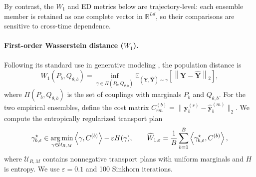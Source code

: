 By contrast, the $W_1$ and ED metrics below are trajectory-level: each
ensemble member is retained as one complete vector in $\mathbb R^{Ld}$, so
their comparisons are sensitive to cross-time dependence.

\paragraph{First-order Wasserstein distance ($W_1$).}
Following its standard use in generative modeling
\citep{arjovsky2017wasserstein}, the population distance is
\begin{equation}
  W_1(P_b,Q_{\theta,b})
  =
  \inf_{\gamma\in\Pi(P_b,Q_{\theta,b})}
  \mathbb{E}_{(\mathbf Y,\widehat{\mathbf Y})\sim\gamma}
  \left[\left\|\mathbf Y-\widehat{\mathbf Y}\right\|_2\right],
  \label{eq:wasserstein-one}
\end{equation}
where $\Pi(P_b,Q_{\theta,b})$ is the set of couplings with marginals $P_b$
and $Q_{\theta,b}$.  For the two empirical ensembles, define the cost matrix
$C^{(b)}_{rm}=\|\mathbf y_b^{(r)}-\widehat{\mathbf y}_b^{(m)}\|_2$.
We compute the entropically regularized transport plan
\citep{cuturi2013sinkhorn}
\begin{equation}
  \gamma_{b,\varepsilon}^{\star}
  \in
  \operatorname*{arg\,min}_{\gamma\in\mathcal{U}_{R,M}}
  \left\langle\gamma,C^{(b)}\right\rangle
  -\varepsilon H(\gamma),
  \qquad
  \widehat W_{1,\varepsilon}
  =
  \frac{1}{B}\sum_{b=1}^{B}
  \left\langle\gamma_{b,\varepsilon}^{\star},C^{(b)}\right\rangle,
  \label{eq:sinkhorn-wasserstein}
\end{equation}
where $\mathcal{U}_{R,M}$ contains nonnegative transport plans with uniform
marginals and $H$ is entropy.  We use $\varepsilon=0.1$ and 100 Sinkhorn
iterations.

